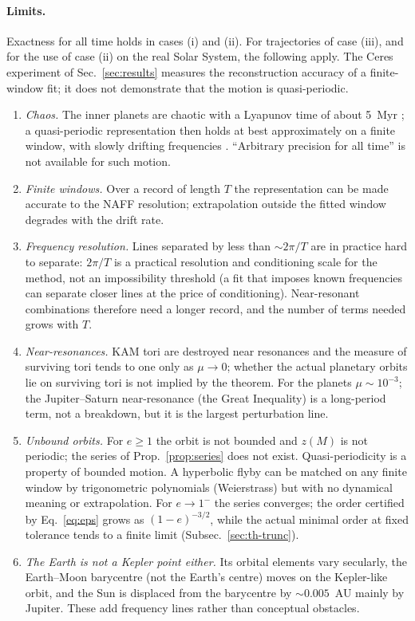 \paragraph*{Limits.} Exactness for all time holds in cases (i) and (ii). For
trajectories of case (iii), and for the use of case (ii) on the real Solar System,
the following apply. The Ceres experiment of Sec.~\ref{sec:results} measures the
reconstruction accuracy of a finite-window fit; it does not demonstrate that the
motion is quasi-periodic.
\begin{enumerate}
\item \emph{Chaos.} The inner planets are chaotic with a Lyapunov time of about
5~Myr \cite{Laskar1990}; a quasi-periodic representation then holds at best
approximately on a finite window, with slowly drifting frequencies \cite{FuLaskar2019}.
``Arbitrary precision for all time'' is not available for such motion.
\item \emph{Finite windows.} Over a record of length $T$ the representation can be
made accurate to the NAFF resolution; extrapolation outside the fitted window
degrades with the drift rate.
\item \emph{Frequency resolution.} Lines separated by less than $\sim2\pi/T$
are in practice hard to separate: $2\pi/T$ is a practical resolution and
conditioning scale for the method, not an impossibility threshold (a fit that
imposes known frequencies can separate closer lines at the price of conditioning).
Near-resonant combinations therefore need a longer record, and the number of
terms needed grows with $T$.
\item \emph{Near-resonances.} KAM tori are destroyed near resonances and the
measure of surviving tori tends to one only as $\mu\to0$; whether the actual
planetary orbits lie on surviving tori is not implied by the theorem. For the planets
$\mu\sim10^{-3}$; the Jupiter--Saturn near-resonance (the Great Inequality) is a
long-period term, not a breakdown, but it is the largest perturbation line.
\item \emph{Unbound orbits.} For $e\ge1$ the orbit is not bounded and $z(M)$ is
not periodic; the series of Prop.~\ref{prop:series} does not exist.
Quasi-periodicity is a property of bounded motion. A hyperbolic flyby can be
matched on any finite window by trigonometric polynomials (Weierstrass) but with
no dynamical meaning or extrapolation. For $e\to1^-$ the series converges; the order certified by
Eq.~\eqref{eq:eps} grows as $(1-e)^{-3/2}$, while the actual minimal order at
fixed tolerance tends to a finite limit (Subsec.~\ref{sec:th-trunc}).
\item \emph{The Earth is not a Kepler point either.} Its orbital elements vary
secularly, the Earth--Moon barycentre (not the Earth's centre) moves on the
Kepler-like orbit, and the Sun is displaced from the barycentre by $\sim0.005$~AU
mainly by Jupiter. These add frequency lines rather than conceptual obstacles.
\end{enumerate}
